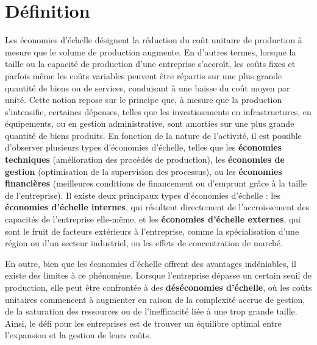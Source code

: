 \begin{section}
 \section*{Définition}
 Les économies d’échelle désignent la réduction du coût unitaire de production à mesure que le volume de production augmente. En d’autres termes, lorsque la taille ou la capacité de production d’une entreprise s’accroît, les coûts fixes et parfois même les coûts variables peuvent être répartis sur une plus grande quantité de biens ou de services, conduisant à une baisse du coût moyen par unité. Cette notion repose sur le principe que, à mesure que la production s’intensifie, certaines dépenses, telles que les investissements en infrastructures, en équipements, ou en gestion administrative, sont amorties sur une plus grande quantité de biens produits. En fonction de la nature de l’activité, il est possible d'observer plusieurs types d'économies d’échelle, telles que les \textbf{économies techniques} (amélioration des procédés de production), les \textbf{économies de gestion} (optimisation de la supervision des processus), ou les \textbf{économies financières} (meilleures conditions de financement ou d'emprunt grâce à la taille de l'entreprise). Il existe deux principaux types d’économies d’échelle : les \textbf{économies d’échelle internes}, qui résultent directement de l’accroissement des capacités de l’entreprise elle-même, et les \textbf{économies d’échelle externes}, qui sont le fruit de facteurs extérieurs à l’entreprise, comme la spécialisation d’une région ou d’un secteur industriel, ou les effets de concentration de marché.

 En outre, bien que les économies d’échelle offrent des avantages indéniables,
 il existe des limites à ce phénomène. Lorsque l’entreprise dépasse un certain
 seuil de production, elle peut être confrontée à des \textbf{déséconomies
   d’échelle}, où les coûts unitaires commencent à augmenter en raison de la
 complexité accrue de gestion, de la saturation des ressources ou de
 l’inefficacité liée à une trop grande taille. Ainsi, le défi pour les
 entreprises est de trouver un équilibre optimal entre l'expansion et la gestion
 de leurs coûts.

 \vfill

\end{section}
